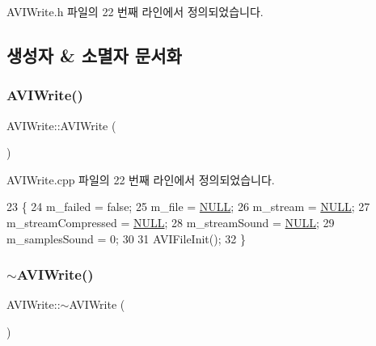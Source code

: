 A\+V\+I\+Write.\+h 파일의 22 번째 라인에서 정의되었습니다.



\subsection{생성자 \& 소멸자 문서화}
\mbox{\label{class_a_v_i_write_a057b52eb963ac47d2e6a5bc7970b2002}} 
\subsubsection{\texorpdfstring{A\+V\+I\+Write()}{AVIWrite()}}
{\footnotesize\ttfamily A\+V\+I\+Write\+::\+A\+V\+I\+Write (\begin{DoxyParamCaption}{ }\end{DoxyParamCaption})}



A\+V\+I\+Write.\+cpp 파일의 22 번째 라인에서 정의되었습니다.


\begin{DoxyCode}
23 \{
24   m\_failed = \textcolor{keyword}{false};
25   m\_file = \mbox{\hyperlink{getopt1_8c_a070d2ce7b6bb7e5c05602aa8c308d0c4}{NULL}};
26   m\_stream = \mbox{\hyperlink{getopt1_8c_a070d2ce7b6bb7e5c05602aa8c308d0c4}{NULL}};
27   m\_streamCompressed = \mbox{\hyperlink{getopt1_8c_a070d2ce7b6bb7e5c05602aa8c308d0c4}{NULL}};
28   m\_streamSound = \mbox{\hyperlink{getopt1_8c_a070d2ce7b6bb7e5c05602aa8c308d0c4}{NULL}};
29   m\_samplesSound = 0;
30   
31   AVIFileInit();
32 \}
\end{DoxyCode}
\mbox{\label{class_a_v_i_write_aa6fcfa34e54a6164554a9f1d43f666ad}} 
\subsubsection{\texorpdfstring{$\sim$\+A\+V\+I\+Write()}{~AVIWrite()}}
{\footnotesize\ttfamily A\+V\+I\+Write\+::$\sim$\+A\+V\+I\+Write (\begin{DoxyParamCaption}{ }\end{DoxyParamCaption})\hspace{0.3cm}{\ttfamily [virtual]}}



